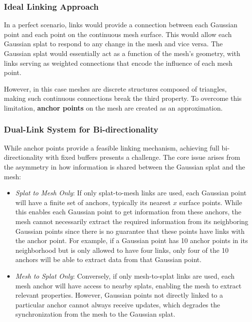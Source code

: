 \subsubsection*{Ideal Linking Approach}

In a perfect scenario, links would provide a connection between each Gaussian point and each point on the continuous mesh surface. This would allow each Gaussian splat to respond to any change in the mesh and vice versa. The Gaussian splat would essentially act as a function of the mesh's geometry, with links serving as weighted connections that encode the influence of each mesh point.

However, in this case meshes are discrete structures composed of triangles, making such continuous connections break the third property. To overcome this limitation, \textbf{anchor points} on the mesh are created as an approximation.


\subsubsection*{Dual-Link System for Bi-directionality}

While anchor points provide a feasible linking mechanism, achieving full bi-directionality with fixed buffers presents a challenge. The core issue arises from the asymmetry in how information is shared between the Gaussian splat and the mesh:  

\begin{itemize}
    \item \textit{Splat to Mesh Only}: If only splat-to-mesh links are used, each Gaussian point will have a finite set of anchors, typically its nearest $x$ surface points. While this enables each Gaussian point to get information from these anchors, the mesh cannot necessarily extract the required information from its neighboring Gaussian points since there is no guarantee that these points have links with the anchor point. For example, if a Gaussian point has 10 anchor points in its neighborhood but is only allowed to have four links, only four of the 10 anchors will be able to extract data from that Gaussian point.
    \item \textit{Mesh to Splat Only}: Conversely, if only mesh-to-splat links are used, each mesh anchor will have access to nearby splats, enabling the mesh to extract relevant properties. However, Gaussian points not directly linked to a particular anchor cannot always receive updates, which degrades the synchronization from the mesh to the Gaussian splat.
\end{itemize}

